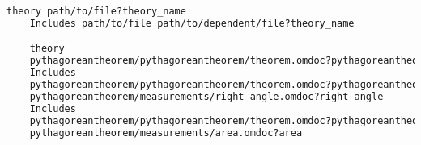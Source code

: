 \begin{frame}
\begin{module}[id=orderedInformationGraphs]
    \begin{lstlisting}[language=HTML]
    theory path/to/file?theory_name
    Includes path/to/file path/to/dependent/file?theory_name

    theory 
    pythagoreantheorem/pythagoreantheorem/theorem.omdoc?pythagoreantheorem
    Includes 
    pythagoreantheorem/pythagoreantheorem/theorem.omdoc?pythagoreantheorem
    pythagoreantheorem/measurements/right_angle.omdoc?right_angle
    Includes 
    pythagoreantheorem/pythagoreantheorem/theorem.omdoc?pythagoreantheorem
    pythagoreantheorem/measurements/area.omdoc?area
    \end{lstlisting}

  \end{module}
\end{frame}
